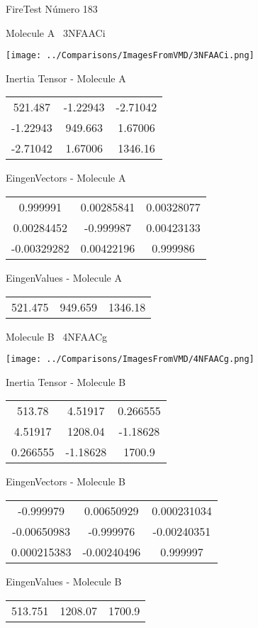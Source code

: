 \vtab[-3cm]
\begin{center}
{\large FireTest \tab Número 183}
\end{center}
\begin{multicols}{2}
\begin{center}

Molecule A \
3NFAACi

\texttt{[image: ../Comparisons/ImagesFromVMD/3NFAACi.png]}

Inertia Tensor - Molecule A \\
\begin{tabular}{|c c c|}
521.487	 & 	-1.22943	 & 	-2.71042	 \\
-1.22943	 & 	949.663	 & 	1.67006	 \\
-2.71042	 & 	1.67006	 & 	1346.16
\end{tabular}

\vtab
 EingenVectors - Molecule A     \\
\begin{tabular}{|c c c|}
0.999991	 & 	0.00285841	 & 	0.00328077	 \\
0.00284452	 & 	-0.999987	 & 	0.00423133	 \\
-0.00329282	 & 	0.00422196	 & 	0.999986
\end{tabular}

\vtab
 EingenValues - Molecule A     \\
\begin{tabular}{|c c c|}
521.475	 & 	949.659	 & 	1346.18	 \\
\end{tabular}
\columnbreak

Molecule B \
4NFAACg

\texttt{[image: ../Comparisons/ImagesFromVMD/4NFAACg.png]}

Inertia Tensor - Molecule B \\
\begin{tabular}{|c c c|}
513.78	 & 	4.51917	 & 	0.266555	 \\
4.51917	 & 	1208.04	 & 	-1.18628	 \\
0.266555	 & 	-1.18628	 & 	1700.9
\end{tabular}

\vtab
 EingenVectors - Molecule B     \\
\begin{tabular}{|c c c|}
-0.999979	 & 	0.00650929	 & 	0.000231034	 \\
-0.00650983	 & 	-0.999976	 & 	-0.00240351	 \\
0.000215383	 & 	-0.00240496	 & 	0.999997
\end{tabular}

\vtab
 EingenValues - Molecule B     \\
\begin{tabular}{|c c c|}
513.751	 & 	1208.07	 & 	1700.9	 \\
\end{tabular}

\end{center}
\end{multicols}

